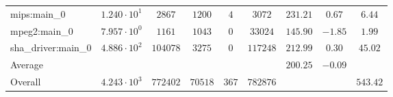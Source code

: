 \begin{tabular}{|l|c|c|c|c|c|c|c|c|}
mips:main\_0            & $ 1.240 \cdot 10^{1}  $ & $ 2867   $ & $ 1200  $ & $ 4   $ & $ 3072   $ & $ 231.21      $ & $ 0.67    $ & $ 6.44    $ \\
mpeg2:main\_0           & $ 7.957 \cdot 10^{0}  $ & $ 1161   $ & $ 1043  $ & $ 0   $ & $ 33024  $ & $ 145.90      $ & $ -1.85   $ & $ 1.99    $ \\
sha\_driver:main\_0     & $ 4.886 \cdot 10^{2}  $ & $ 104078 $ & $ 3275  $ & $ 0   $ & $ 117248 $ & $ 212.99      $ & $ 0.30    $ & $ 45.02   $ \\
\hline
Average                 & $                     $ & $        $ & $       $ & $     $ & $        $ & $ 200.25      $ & $ -0.09   $ & $         $ \\
\hline
Overall                 & $ 4.243 \cdot 10^{3}  $ & $ 772402 $ & $ 70518 $ & $ 367 $ & $ 782876 $ & $             $ & $         $ & $ 543.42  $ \\
\hline
\end{tabular}
